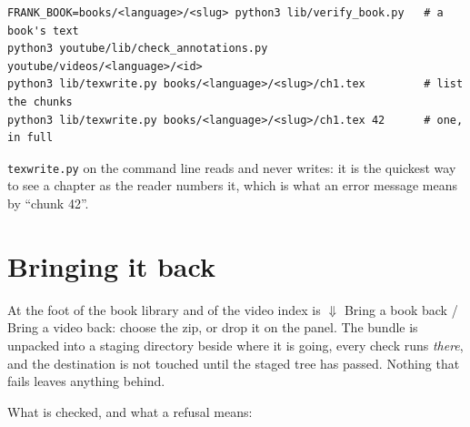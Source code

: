 \documentclass[11pt,oneside]{report}
\newcommand{\file}[1]{\texttt{#1}}
\newcommand{\menu}[1]{\textsf{#1}}
\begin{document}
\begin{lstlisting}
FRANK_BOOK=books/<language>/<slug> python3 lib/verify_book.py   # a book's text
python3 youtube/lib/check_annotations.py youtube/videos/<language>/<id>
python3 lib/texwrite.py books/<language>/<slug>/ch1.tex         # list the chunks
python3 lib/texwrite.py books/<language>/<slug>/ch1.tex 42      # one, in full
\end{lstlisting}

\noindent \file{texwrite.py} on the command line reads and never writes: it is
the quickest way to see a chapter as the reader numbers it, which is what an
error message means by ``chunk 42''.

\section{Bringing it back}
\label{sec:upload}

At the foot of the book library and of the video index is \menu{$\Downarrow$
Bring a book back} / \menu{Bring a video back}: choose the zip, or drop it on
the panel. The bundle is unpacked into a staging directory beside where it is
going, every check runs \emph{there}, and the destination is not touched until
the staged tree has passed. Nothing that fails leaves anything behind.

What is checked, and what a refusal means:
\end{document}
